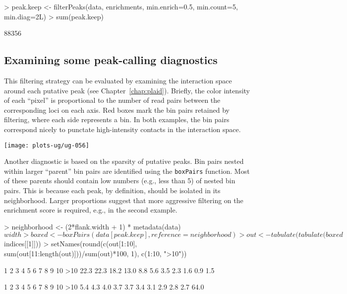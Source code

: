 \documentclass[12pt]{report}
\renewenvironment{Schunk}{\vspace{0pt}}{\vspace{0pt}}
\newcommand{\code}[1]{{\small\texttt{#1}}}
\begin{document}
\begin{Schunk}
\begin{Sinput}
> peak.keep <- filterPeaks(data, enrichments, min.enrich=0.5, min.count=5, min.diag=2L)
> sum(peak.keep)
\end{Sinput}
\begin{Soutput}
[1] 88356
\end{Soutput}
\end{Schunk}

\subsection{Examining some peak-calling diagnostics}
This filtering strategy can be evaluated by examining the interaction space around each putative peak (see Chapter~\ref{chap:plaid}).
Briefly, the color intensity of each ``pixel'' is proportional to the number of read pairs between the corresponding loci on each axis.
Red boxes mark the bin pairs retained by filtering, where each side represents a bin.
In both examples, the bin pairs correspond nicely to punctate high-intensity contacts in the interaction space.

\begin{center}
\texttt{[image: plots-ug/ug-056]}
\end{center}

Another diagnostic is based on the sparsity of putative peaks.
Bin pairs nested within larger ``parent'' bin pairs are identified using the \code{boxPairs} function.
Most of these parents should contain low numbers (e.g., less than 5) of nested bin pairs.
This is because each peak, by definition, should be isolated in its neighborhood.
Larger proportions suggest that more aggressive filtering on the enrichment score is required, e.g., in the second example. 

\begin{Schunk}
\begin{Sinput}
> neighborhood <- (2*flank.width + 1) * metadata(data)$width
> boxed <- boxPairs(data[peak.keep], reference=neighborhood)
> out <- tabulate(tabulate(boxed$indices[[1]]))
> setNames(round(c(out[1:10], sum(out[11:length(out)]))/sum(out)*100, 1), c(1:10, ">10"))
\end{Sinput}
\begin{Soutput}
   1    2    3    4    5    6    7    8    9   10  >10 
22.3 22.3 18.2 13.0  8.8  5.6  3.5  2.3  1.6  0.9  1.5 
\end{Soutput}
\begin{Soutput}
   1    2    3    4    5    6    7    8    9   10  >10 
 5.4  4.3  4.0  3.7  3.7  3.4  3.1  2.9  2.8  2.7 64.0 
\end{Soutput}
\end{Schunk}
\end{document}
